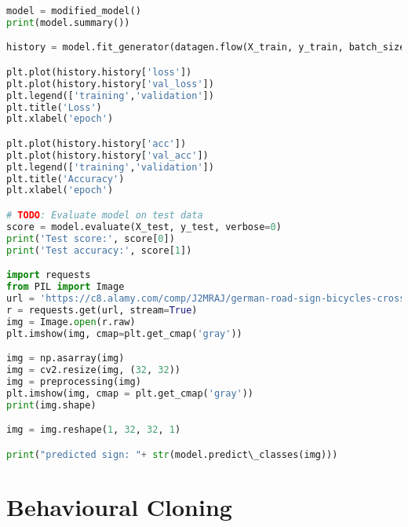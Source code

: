 \begin{lstlisting}[language=Python]
model = modified_model()
print(model.summary())

history = model.fit_generator(datagen.flow(X_train, y_train, batch_size=50),steps_per_epoch=2000,epochs=10,validation_data=(X_val, y_val), shuffle = 1)

plt.plot(history.history['loss'])
plt.plot(history.history['val_loss'])
plt.legend(['training','validation'])
plt.title('Loss')
plt.xlabel('epoch')

plt.plot(history.history['acc'])
plt.plot(history.history['val_acc'])
plt.legend(['training','validation'])
plt.title('Accuracy')
plt.xlabel('epoch')

# TODO: Evaluate model on test data
score = model.evaluate(X_test, y_test, verbose=0)
print('Test score:', score[0])
print('Test accuracy:', score[1])

import requests
from PIL import Image
url = 'https://c8.alamy.com/comp/J2MRAJ/german-road-sign-bicycles-crossing-J2MRAJ.jpg'
r = requests.get(url, stream=True)
img = Image.open(r.raw)
plt.imshow(img, cmap=plt.get_cmap('gray'))

img = np.asarray(img)
img = cv2.resize(img, (32, 32))
img = preprocessing(img)
plt.imshow(img, cmap = plt.get_cmap('gray'))
print(img.shape)

img = img.reshape(1, 32, 32, 1)

print("predicted sign: "+ str(model.predict\_classes(img)))

\end{lstlisting}

\section{Behavioural Cloning}

